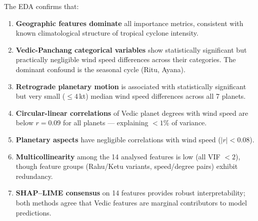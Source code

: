 \documentclass[11pt,a4paper]{article}
\begin{document}
The EDA confirms that:
\begin{enumerate}[noitemsep]
  \item \textbf{Geographic features dominate} all importance metrics, consistent with
        known climatological structure of tropical cyclone intensity.
  \item \textbf{Vedic-Panchang categorical variables} show statistically significant but
        practically negligible wind speed differences across their categories. The
        dominant confound is the seasonal cycle (Ritu, Ayana).
  \item \textbf{Retrograde planetary motion} is associated with statistically significant
        but very small ($\leq 4$\,kt) median wind speed differences across all 7 planets.
  \item \textbf{Circular-linear correlations} of Vedic planet degrees with wind speed are
        below $r = 0.09$ for all planets --- explaining $< 1\%$ of variance.
  \item \textbf{Planetary aspects} have negligible correlations with wind speed ($|r| < 0.08$).
  \item \textbf{Multicollinearity} among the 14 analysed features is low (all VIF $< 2$),
        though feature groups (Rahu/Ketu variants, speed/degree pairs) exhibit redundancy.
  \item \textbf{SHAP--LIME consensus} on 14 features
        provides robust interpretability; both methods agree that Vedic features are marginal
        contributors to model predictions.
\end{enumerate}
\end{document}
